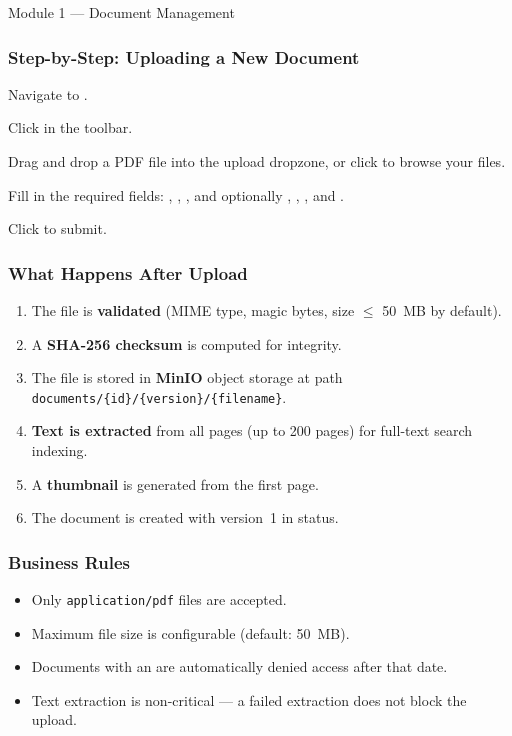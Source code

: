 \begin{ugModule}{Module 1 --- Document Management}
  \subsubsection*{Step-by-Step: Uploading a New Document}
  \begin{ugSteps}
    \item Navigate to .
    \item Click  in the toolbar.
    \item Drag and drop a PDF file into the upload dropzone, or
          click to browse your files.
    \item Fill in the required fields:
          , ,
          , and optionally ,
          , , and
          .
    \item Click  to submit.
  \end{ugSteps}

  \subsubsection*{What Happens After Upload}
  \begin{enumerate}[leftmargin=18pt]
    \item The file is \textbf{validated} (MIME type, magic bytes,
          size $\leq$ 50~MB by default).
    \item A \textbf{SHA-256 checksum} is computed for integrity.
    \item The file is stored in \textbf{MinIO} object storage at
          path \texttt{documents/\{id\}/\{version\}/\{filename\}}.
    \item \textbf{Text is extracted} from all pages (up to 200
          pages) for full-text search indexing.
    \item A \textbf{thumbnail} is generated from the first page.
    \item The document is created with version~1 in
           status.
  \end{enumerate}

  \subsubsection*{Business Rules}
  \begin{itemize}[leftmargin=18pt]
    \item Only \texttt{application/pdf} files are accepted.
    \item Maximum file size is configurable (default: 50~MB).
    \item Documents with an  are
          automatically denied access after that date.
    \item Text extraction is non-critical --- a failed extraction
          does not block the upload.
  \end{itemize}
\end{ugModule}

